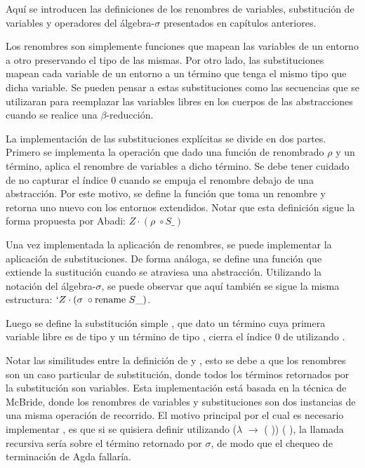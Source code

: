 Aquí se introducen las definiciones de los renombres de variables, substitución de variables y operadores del álgebra-$\sigma$ presentados en capítulos anteriores.


Los renombres son simplemente funciones que mapean las variables de un entorno a otro preservando el tipo de las mismas.
Por otro lado, las substituciones mapean cada variable de un entorno a un término que tenga el mismo tipo que dicha variable.
Se pueden pensar a estas substituciones como las secuencias que se utilizaran para reemplazar las variables libres en los cuerpos de las abstracciones cuando se realice una $\beta$-reducción. 

La implementación de las substituciones explícitas se divide en dos partes.
Primero se implementa la operación  que dado una función de renombrado $\rho$ y un término, aplica el renombre de variables a dicho término.
Se debe tener cuidado de no capturar el índice 0 cuando se empuja el renombre debajo de una abstracción.
Por este motivo, se define la función  que toma un renombre y retorna uno nuevo con los entornos extendidos.
Notar que esta definición sigue la forma propuesta por Abadi: $Z \cdot (\rho \; \circ S\_)$


Una vez implementada la aplicación de renombres, se puede implementar la aplicación de substituciones.
De forma análoga, se define una función  que extiende la sustitución cuando se atraviesa una abstracción.
Utilizando la notación del álgebra-$\sigma$, se puede observar que aquí también se sigue la misma estructura: $`Z \cdot (\sigma \; \circ \text{rename } S\_)$.

Luego se define la substitución simple \func{$\_[\_]$}, que dato un término  cuya primera variable libre es de tipo  y un término  de tipo , cierra el índice 0 de  utilizando .


Notar las similitudes entre la definición de  y , esto se debe a que los renombres son un caso particular de substitución, donde todos los términos retornados por la substitución son variables.
Esta implementación está basada en la técnica de McBride\cite{ren-sub}, donde los renombres de variables y substituciones son dos instancias de una misma operación de recorrido.
El motivo principal por el cual es necesario implementar , es que si se quisiera definir  utilizando  ($\lambda$  $\rightarrow$  ( )) (\bound{$\sigma$} ), la llamada recursiva sería sobre el término retornado por $\sigma$, de modo que el chequeo de terminación de Agda fallaría.

